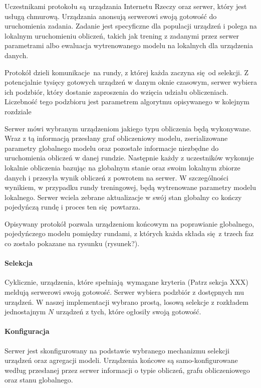 Uczestnikami protokołu są urządzania Internetu Rzeczy oraz serwer, który jest usługą chmurową.
Urządzania anonsują serwerowi swoją gotowość do uruchomienia zadania. Zadanie jest specyficzne dla populacji urządzeń i polega na lokalnym uruchomieniu obliczeń, takich jak trening z zadanymi przez serwer parametrami albo ewaluacja wytrenowanego modelu na lokalnych dla urządzenia danych.

Protokół dzieli komunikacje na rundy, z której każda zaczyna się od selekcji. Z potencjalnie tysięcy gotowych urządzeń w danym oknie czasowym, serwer wybiera ich podzbiór, który dostanie zaproszenia do wzięcia udziału obliczeniach. Liczebność tego podzbioru jest parametrem algorytmu opisywanego w kolejnym rozdziale

Serwer mówi wybranym urządzeniom jakiego typu obliczenia będą wykonywane. Wraz z tą informacją
przesłany graf obliczeniowy modelu, zserializowane parametry globalnego modelu oraz pozostałe
informacje niezbędne do uruchomienia obliczeń w danej rundzie. Następnie każdy z uczestników  wykonuje lokalnie obliczenia bazując na globalnym stanie oraz swoim lokalnym zbiorze danych i przesyła wynik obliczeń z powrotem na serwer. W szczególności wynikiem, w przypadku rundy treningowej, będą wytrenowane parametry modelu lokalnego. Serwer wciela zebrane aktualizacje w swój stan globalny co kończy pojedyńczą rundę i proces ten się powtarza.

Opisywany protokół pozwala urządzeniom końcowym na poprawianie globalnego, pojedyńczego modelu pomiędzy rundami, z których każda składa się z trzech faz co zostało pokazane na rysunku (rysunek?).

\paragraph{Selekcja}
Cyklicznie, urządzenia, które spełniają wymagane kryteria (Patrz sekcja XXX) meldują serwerowi swoją gotowość. Serwer wybiera podzbiór z dostępnych mu urządzeń. W naszej implementacji wybrano prostą, losową selekcje  z rozkładem jednostajnym \(N\) urządzeń z tych, które
ogłosiły swoją gotowość. 


\paragraph{Konfiguracja}
Serwer jest skonfigurowany na podstawie wybranego mechanizmu selekcji urządzeń oraz agregacji
modeli. Urządzenia końcowe są samo-konfigurowane według przesłanej przez serwer informacji o typie obliczeń, grafu obliczeniowego oraz stanu globalnego.

